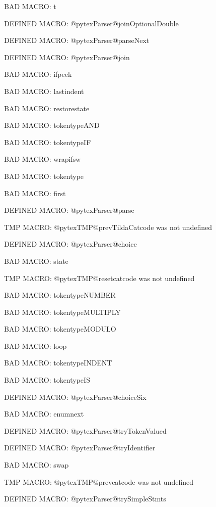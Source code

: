 BAD MACRO: t

\ifx\@pytexParser@joinOptionalDouble\undefined\else DEFINED MACRO: @pytexParser@joinOptionalDouble
\fi

\ifx\@pytexParser@parseNext\undefined\else DEFINED MACRO: @pytexParser@parseNext
\fi

\ifx\@pytexParser@join\undefined\else DEFINED MACRO: @pytexParser@join
\fi

BAD MACRO: ifpeek

BAD MACRO: lastindent

BAD MACRO: restorestate

BAD MACRO: tokentypeAND

BAD MACRO: tokentypeIF

BAD MACRO: wrapifsw

BAD MACRO: tokentype

BAD MACRO: first

\ifx\@pytexParser@parse\undefined\else DEFINED MACRO: @pytexParser@parse
\fi

\ifx\@pytexTMP@prevTildaCatcode\undefined\else TMP MACRO: @pytexTMP@prevTildaCatcode was not undefined
\fi

\ifx\@pytexParser@choice\undefined\else DEFINED MACRO: @pytexParser@choice
\fi

BAD MACRO: state

\ifx\@pytexTMP@resetcatcode\undefined\else TMP MACRO: @pytexTMP@resetcatcode was not undefined
\fi

BAD MACRO: tokentypeNUMBER

BAD MACRO: tokentypeMULTIPLY

BAD MACRO: tokentypeMODULO

BAD MACRO: loop

BAD MACRO: tokentypeINDENT

BAD MACRO: tokentypeIS

\ifx\@pytexParser@choiceSix\undefined\else DEFINED MACRO: @pytexParser@choiceSix
\fi

BAD MACRO: enumnext

\ifx\@pytexParser@tryTokenValued\undefined\else DEFINED MACRO: @pytexParser@tryTokenValued
\fi

\ifx\@pytexParser@tryIdentifier\undefined\else DEFINED MACRO: @pytexParser@tryIdentifier
\fi

BAD MACRO: swap

\ifx\@pytexTMP@prevcatcode\undefined\else TMP MACRO: @pytexTMP@prevcatcode was not undefined
\fi

\ifx\@pytexParser@trySimpleStmts\undefined\else DEFINED MACRO: @pytexParser@trySimpleStmts
\fi

